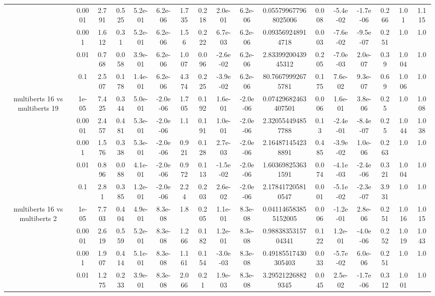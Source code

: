 \begin{tabular}{|c|c|c|c|c|c|c|c|c|c|c|c|c|c|c|c|c|}
 & 0.0001 & 2.791 & 0.525 & 5.2e-01 & 6.2e-06 & 1.735 & 0.218 & 2.0e-01 & 6.2e-06 & 0.055799677968025006 & 0.008 & -5.4e-02 & -1.7e-06 & 0.266 & 1.01 & 1.115 \\
 & 0.001 & 1.612 & 0.31 & 5.2e-01 & 6.2e-06 & 1.56 & 0.222 & 6.7e-03 & 6.2e-06 & 0.093569248914718 & 0.003 & -7.6e-02 & -9.5e-07 & 0.251 & 1.0 & 1.0 \\
 & 0.01 & 0.768 & 0.058 & 3.9e-01 & 6.2e-06 & 1.007 & 0.096 & -2.6e-02 & 6.2e-06 & 2.8339920043945312 & 0.205 & -7.0e-03 & 2.0e-07 & 0.39 & 1.004 & 1.0 \\
 & 0.1 & 2.507 & 0.178 & 1.4e-01 & 6.2e-06 & 4.374 & 0.225 & -3.9e-02 & 6.2e-06 & 80.76679992675781 & 0.175 & 7.6e-02 & 9.3e-07 & 0.69 & 1.006 & 1.0 \\
\hline
\multirow{5}{*}{multiberts 16 vs multiberts 19} & 1e-05 & 7.425 & 0.344 & 5.0e-01 & -2.0e-06 & 1.705 & 0.192 & 1.6e-01 & -2.0e-06 & 0.07429682463407501 & 0.006 & 1.6e-01 & 3.8e-06 & 0.25 & 1.0 & 1.008 \\
 & 0.0001 & 2.457 & 0.481 & 5.3e-01 & -2.0e-06 & 1.1 & 0.191 & 1.0e-01 & -2.0e-06 & 2.320554494857788 & 0.13 & -2.4e-01 & -8.4e-07 & 0.25 & 1.044 & 1.038 \\
 & 0.001 & 1.576 & 0.338 & 5.3e-01 & -2.0e-06 & 0.921 & 0.128 & 2.7e-03 & -2.0e-06 & 2.164871454238891 & 0.485 & -3.9e-02 & 1.0e-06 & 0.263 & 1.0 & 1.0 \\
 & 0.01 & 0.896 & 0.088 & 4.1e-01 & -2.0e-06 & 0.972 & 0.113 & -1.5e-02 & -2.0e-06 & 1.603698253631591 & 0.074 & -4.1e-03 & -2.4e-06 & 0.321 & 1.004 & 1.0 \\
 & 0.1 & 2.81 & 0.385 & 1.2e-01 & -2.0e-06 & 2.24 & 0.203 & 2.6e-02 & -2.0e-06 & 2.178417205810547 & 0.001 & -5.1e-02 & -2.3e-07 & 3.931 & 1.0 & 1.0 \\
\hline
\multirow{5}{*}{multiberts 16 vs multiberts 2} & 1e-05 & 7.703 & 0.404 & 4.9e-01 & 8.3e-08 & 1.8 & 0.205 & 1.1e-01 & 8.3e-08 & 0.041146583855152005 & 0.006 & -1.2e-01 & 2.8e-06 & 0.251 & 1.016 & 1.015 \\
 & 0.0001 & 2.619 & 0.559 & 5.2e-01 & 8.3e-08 & 1.266 & 0.182 & 1.2e-01 & 8.3e-08 & 0.9883835315704341 & 0.122 & 1.2e-01 & -4.0e-06 & 0.252 & 1.019 & 1.043 \\
 & 0.001 & 1.907 & 0.414 & 5.1e-01 & 8.3e-08 & 1.161 & 0.154 & -3.0e-03 & 8.3e-08 & 0.49185517430305403 & 0.033 & -5.7e-02 & 6.0e-06 & 0.251 & 1.0 & 1.0 \\
 & 0.01 & 1.275 & 0.233 & 3.9e-01 & 8.3e-08 & 2.066 & 0.21 & 1.9e-03 & 8.3e-08 & 3.295212268829345 & 0.045 & 2.5e-02 & -1.7e-06 & 0.312 & 1.001 & 1.0 \\

\end{tabular}
